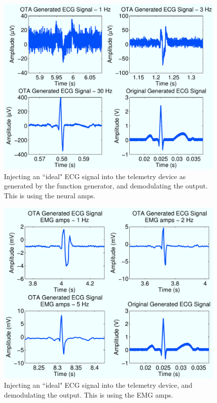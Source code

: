 \documentclass[12pt,onecolumn,titlepage]{article}
\begin{document}
\begin{figure}[htbp]
	\centering
	\includegraphics[width=\textwidth]{Pictures/13Mar2013/arb_sig_gen_OTA_ECG_freq_resp}
	\caption{Injecting an ``ideal" ECG signal into the telemetry device as generated by the function generator, and demodulating the output. This is using the neural amps.}
	\label{fig:arb_sig_gen_OTA_ECG_freq_resp}
\end{figure}


\begin{figure}[htbp]
	\centering
	\includegraphics[width=\textwidth]{Pictures/13Mar2013/arb_sig_gen_OTA_ECG_EMGfreq_resp}
	\caption{Injecting an ``ideal" ECG signal into the telemetry device, and demodulating the output. This is using the EMG amps.}
	\label{fig:arb_sig_gen_OTA_ECG_EMGfreq_resp}
\end{figure}
\end{document}
